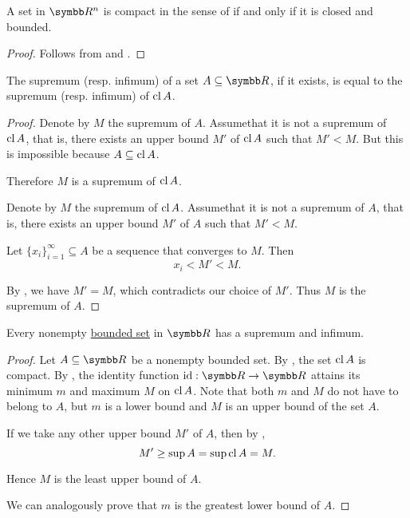 \begin{theorem}\label{thm:heine_borel}
  A set in \( \BR^n \) is compact in the sense of  if and only if it is closed and bounded.
\end{theorem}
\begin{proof}
  Follows from  and .
\end{proof}

\begin{proposition}\label{thm:real_supremum_of_closure}
  The supremum (resp. infimum) of a set \( A \subseteq \BR \), if it exists, is equal to the supremum (resp. infimum) of \( \operatorname{cl} A \).
\end{proposition}
\begin{proof}
  \Sufficiency Denote by \( M \) the supremum of \( A \). Assume\LEM that it is not a supremum of \( \operatorname{cl} A \), that is, there exists an upper bound \( M' \) of \( \operatorname{cl} A \) such that \( M' < M \). But this is impossible because \( A \subseteq \operatorname{cl} A \).

  Therefore \( M \) is a supremum of \( \operatorname{cl} A \).

  \Necessity Denote by \( M \) the supremum of \( \operatorname{cl} A \). Assume\LEM that it is not a supremum of \( A \), that is, there exists an upper bound \( M' \) of \( A \) such that \( M' < M \).

  Let \( \{ x_i \}_{i=1}^\infty \subseteq A \) be a sequence that converges to \( M \). Then
  \begin{equation*}
    x_i < M' < M.
  \end{equation*}

  By , we have \( M' = M \), which contradicts our choice of \( M' \). Thus \( M \) is the supremum of \( A \).
\end{proof}

\begin{proposition}\label{thm:real_bounded_set_has_supremum}
  Every nonempty \hyperref[def:metric_space/bounded_set]{bounded set} in \( \BR \) has a supremum and infimum.
\end{proposition}
\begin{proof}
  Let \( A \subseteq \BR \) be a nonempty bounded set. By , the set \( \operatorname{cl} A \) is compact. By , the identity function \( \Id: \BR \to \BR \) attains its minimum \( m \) and maximum \( M \) on \( \operatorname{cl} A \). Note that both \( m \) and \( M \) do not have to belong to \( A \), but \( m \) is a lower bound and \( M \) is an upper bound of the set \( A \).

  If we take any other upper bound \( M' \) of \( A \), then by ,
  \begin{equation*}
    M' \geq \sup A = \sup \operatorname{cl} A = M.
  \end{equation*}

  Hence \( M \) is the least upper bound of \( A \).

  We can analogously prove that \( m \) is the greatest lower bound of \( A \).
\end{proof}
